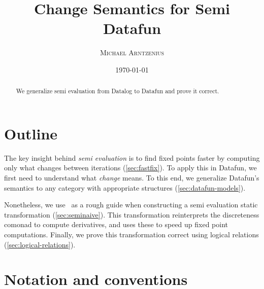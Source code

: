\title{Change Semantics for Semi\naive{} Datafun}
\author{\scshape Michael Arntzenius}
\date{\today}

\maketitle

\begin{abstract}
  We generalize semi\naive{} evaluation from Datalog to Datafun and prove it
  correct.
\end{abstract}

\section{Outline}

The key insight behind \emph{semi\naive{} evaluation} is to find fixed points
faster by computing only what changes between iterations (\cref{sec:fastfix}).
To apply this in Datafun, we first need to understand what \emph{change} means.
%
To this end, we generalize Datafun's \Poset{} semantics to any category with
appropriate structures (\cref{sec:datafun-models}).


Nonetheless, we use \CP\ as a rough guide when constructing a semi\naive{}
evaluation static transformation (\cref{sec:seminaive}). This transformation
reinterprets the discreteness comonad to compute derivatives, and uses these to
speed up fixed point computations. Finally, we prove this transformation correct
using logical relations (\cref{sec:logical-relations}).



\section{Notation and conventions}

